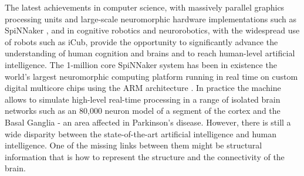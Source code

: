 \documentclass{article}
\begin{document}
The latest achievements in computer science, with massively parallel graphics processing units and large-scale neuromorphic hardware implementations such as SpiNNaker \cite{Furber2013}, and in cognitive robotics and neurorobotics, with the widespread use of robots such as iCub, provide the opportunity to significantly advance the understanding of human cognition and brains and to reach human-level artificial intelligence. 
The 1-million core SpiNNaker system has been in existence the world’s largest neuromorphic computing platform running in real time on custom digital multicore chips using the ARM architecture \cite{Furber2020}.
In practice the machine allows to simulate high-level real-time processing in a range of isolated brain networks such as 
an 80,000 neuron model of a segment of the cortex and the Basal Ganglia - an area affected in Parkinson’s disease.
However, there is still a wide disparity between the state-of-the-art artificial intelligence and human intelligence.
One of the missing links between them might be structural information that is how to represent the structure and the connectivity of the brain.
\end{document}
